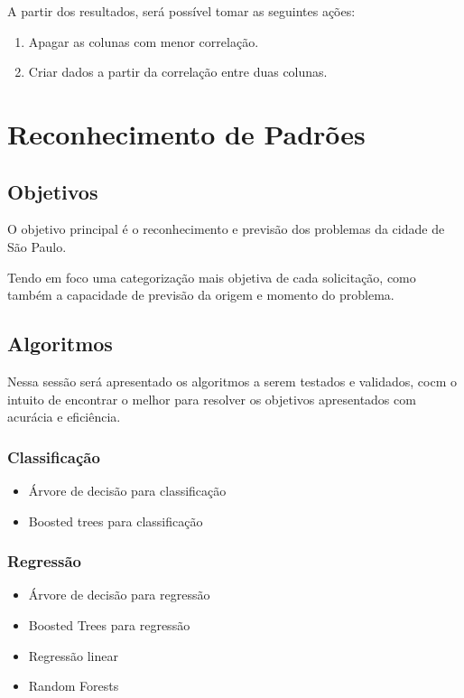 \documentclass[a4paper,12pt]{article}
\begin{document}
A partir dos resultados, será possível tomar as seguintes ações:
\begin{enumerate}
    \item Apagar as colunas com menor correlação.
    \item Criar dados a partir da correlação entre duas colunas.
\end{enumerate}



\section{Reconhecimento de Padrões}
\subsection{Objetivos}
O objetivo principal é o reconhecimento e previsão dos problemas da cidade de São Paulo.

Tendo em foco uma categorização mais objetiva de cada solicitação, como também a capacidade de previsão da origem e momento do problema.

\subsection{Algoritmos}

Nessa sessão será apresentado os algoritmos a serem testados e validados, cocm o intuito de encontrar o melhor para resolver os objetivos apresentados com acurácia e eficiência.

\subsubsection{Classificação}
\begin{itemize}
    \item Árvore de decisão para classificação
    \item Boosted trees para classificação
\end{itemize}

\subsubsection{Regressão}
\begin{itemize}
    \item Árvore de decisão para regressão
    \item Boosted Trees para regressão
    \item Regressão linear
    \item Random Forests
\end{itemize}
\end{document}
